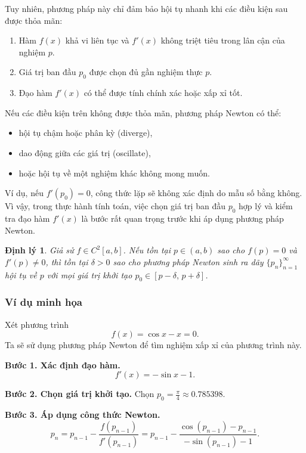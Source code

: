 Tuy nhiên, phương pháp này chỉ đảm bảo hội tụ nhanh khi các điều kiện sau được thỏa mãn:
\begin{enumerate}
    \item Hàm $f(x)$ khả vi liên tục và $f'(x)$ không triệt tiêu trong lân cận của nghiệm $p$.
    \item Giá trị ban đầu $p_0$ được chọn đủ gần nghiệm thực $p$.
    \item Đạo hàm $f'(x)$ có thể được tính chính xác hoặc xấp xỉ tốt.
\end{enumerate}

Nếu các điều kiện trên không được thỏa mãn, phương pháp Newton có thể:
\begin{itemize}
    \item hội tụ chậm hoặc phân kỳ (diverge),
    \item dao động giữa các giá trị (oscillate),
    \item hoặc hội tụ về một nghiệm khác không mong muốn.
\end{itemize}

\noindent
Ví dụ, nếu $f'(p_0) = 0$, công thức lặp sẽ không xác định do mẫu số bằng không. Vì vậy, trong thực hành tính toán, việc chọn giá trị ban đầu $p_0$ hợp lý và kiểm tra đạo hàm $f'(x)$ là bước rất quan trọng trước khi áp dụng phương pháp Newton.

\newtheorem{theorem}{Định lý}
\begin{theorem}
Giả sử $f \in C^2[a, b]$. 
Nếu tồn tại $p \in (a, b)$ sao cho $f(p) = 0$ và $f'(p) \neq 0$, 
thì tồn tại $\delta > 0$ sao cho phương pháp Newton sinh ra dãy 
$\{p_n\}_{n=1}^{\infty}$ hội tụ về $p$ với mọi giá trị khởi tạo 
$p_0 \in [p - \delta,\, p + \delta]$.
\end{theorem}

\subsubsection*{Ví dụ minh họa}

Xét phương trình
\[
    f(x) = \cos x - x = 0.
\]
Ta sẽ sử dụng phương pháp Newton để tìm nghiệm xấp xỉ của phương trình này.

\textbf{Bước 1. Xác định đạo hàm.}
\[
    f'(x) = -\sin x - 1.
\]

\textbf{Bước 2. Chọn giá trị khởi tạo.}
Chọn $p_0 = \frac{\pi}{4} \approx 0.785398$.

\textbf{Bước 3. Áp dụng công thức Newton.}
\[
    p_{n} = p_{n-1} - \frac{f(p_{n-1})}{f'(p_{n-1})} 
           = p_{n-1} - \frac{\cos(p_{n-1}) - p_{n-1}}{-\sin(p_{n-1}) - 1}.
\]

